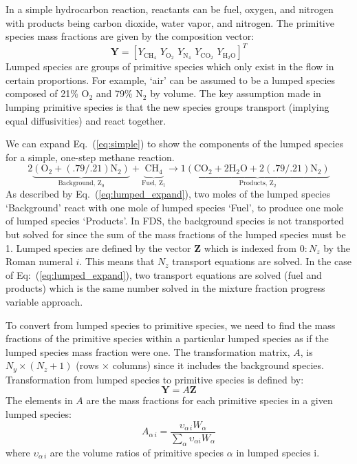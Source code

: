 In a simple hydrocarbon reaction, reactants can be fuel, oxygen, and nitrogen with products being carbon dioxide, water vapor, and nitrogen. The primitive species mass fractions are given by the composition vector:
\begin{equation}\label{eq:prim_vector}
\mathbf{Y} = [Y_{\mathrm{CH}_4}\, \, Y_{\mathrm{O}_2}\, \, Y_{\mathrm{N}_4}\, \, Y_{\mathrm{CO}_2}\, \, Y_{\mathrm{H}_2\mathrm{O}}]^T
\end{equation}
Lumped species are groups of primitive species which only exist in the flow in certain proportions. For example, `air' can be assumed to be a lumped species composed of 21\% O$_2$ and 79\% N$_2$ by volume. The key assumption made in lumping primitive species is that the new species groups transport (implying equal diffusivities) and react together. 

We can expand Eq.~(\ref{eq:simple}) to show the components of the lumped species for a simple, one-step methane reaction. 
\begin{equation}\label{eq:lumped_expand}
\mathrm{2\underbrace{(\mbox{O}_2+(.79/.21)\mbox{N}_2)}_\text{Background,~Z$_0$}+\underbrace{\mbox{CH}_4}_\text{Fuel,~Z$_1$} \rightarrow 1\underbrace{(\mbox{CO}_2+2\mbox{H}_2\mbox{O}+2(.79/.21)\mbox{N}_2)}_\text{Products,~Z$_2$}}
\end{equation}
As described by Eq.~(\ref{eq:lumped_expand}), two moles of the lumped species `Background' react with one mole of lumped species `Fuel', to produce one mole of lumped species `Products'. In FDS, the background species is not transported but solved for since the sum of the mass fractions of the lumped species must be 1. Lumped species are defined by the vector $\textbf{Z}$ which is indexed from $0:N_{z}$ by the Roman numeral $i$. This means that $N_{z}$ transport equations are solved. In the case of Eq:~(\ref{eq:lumped_expand}), two transport equations are solved (fuel and products) which is the same number solved in the mixture fraction progress variable approach.

To convert from lumped species to primitive species, we need to find the mass fractions of the primitive species within a particular lumped species as if the lumped species mass fraction were one. The transformation matrix, $A$, is $N_{y} \times (N_{z}+1)$ (rows $\times$ columns) since it includes the background species. Transformation from lumped species to primitive species is defined by: 
\begin{equation}\label{eq:transform}
\textbf{Y}=A\textbf{Z} 
\end{equation}
The elements in $A$ are the mass fractions for each primitive species in a given lumped species:
\begin{equation}\label{eq:A_def}
A_{\alpha\,i} = \frac{\upsilon_{\alpha\,i}W_{\alpha}}{\displaystyle \sum_{\alpha}\upsilon_{\alpha i}W_{\alpha}}
\end{equation}
where $\upsilon_{\alpha\,i}$ are the volume ratios of primitive species $\alpha$ in lumped species {i}.

